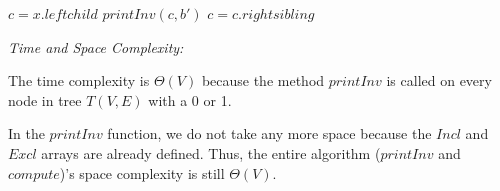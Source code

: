 \documentclass[a4paper]{report}
\begin{document}
\begin{enumerate}
\begin{algorithmic}[1]
          \State $c = x.leftchild$
            \State $printInv(c, b')$
            \State $c = c.rightsibling$
          \EndWhile
        \EndFunction
      \end{algorithmic}

      {\it Time and Space Complexity:}

      The time complexity is $\Theta(V)$ because the method $printInv$ is called on every node in tree $T(V,E)$ with a 0 or 1.

      In the $printInv$ function, we do not take any more space because the $Incl$ and $Excl$ arrays are already defined. 
      Thus, the entire algorithm ($printInv$ and $compute$)'s space complexity is still $\Theta(V)$.


  \end{enumerate}

  
















































  
\end{document}
